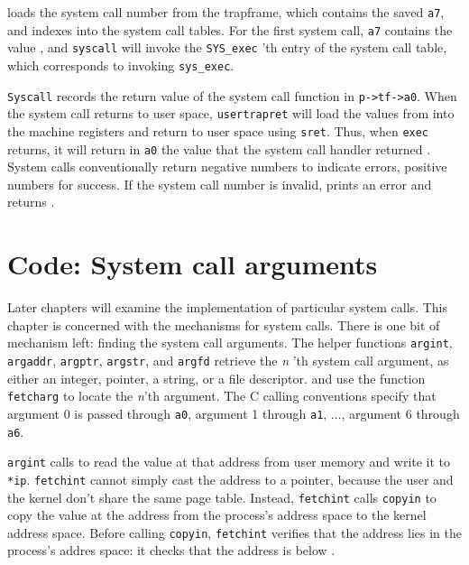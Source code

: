 loads the system call number from the trapframe, which
contains the saved
\texttt{a7},
and indexes into the system call tables.
For the first system call, 
\texttt{a7}
contains the value 
,
and
\lstinline{syscall}
will invoke the 
\lstinline{SYS_exec} 'th 
entry of the system call table, which corresponds to invoking
\lstinline{sys_exec}.

\lstinline{Syscall}
records the return value of the system call function in
\lstinline{p->tf->a0}.
When the system call returns to user space,
\lstinline{usertrapret}
will load the values
from
into the machine registers
and return to user space
using
\lstinline{sret}.
Thus, when 
\lstinline{exec}
returns, it will return in \lstinline{a0} the value
that the system call handler returned
.
System calls conventionally return negative numbers to indicate
errors, positive numbers for success.
If the system call number is invalid,
prints an error and returns .

\section{Code: System call arguments}

Later chapters will examine the implementation of
particular system calls.
This chapter is concerned with the mechanisms for system calls.
There is one bit of mechanism left: finding the system call arguments.
The helper functions
\lstinline{argint},
\lstinline{argaddr},
\lstinline{argptr},
\lstinline{argstr},
and
\lstinline{argfd}
retrieve the 
\textit{n} 'th 
system call
argument, as either an integer, pointer, a string, or a file descriptor.
and
use the function
\lstinline{fetcharg}
to locate the
\textit{n}'th 
argument. The C calling conventions specify that argument 0 is passed
through
\texttt{a0},
argument 1 through
\texttt{a1}, ...,
argument 6 through
\texttt{a6}.

\lstinline{argint} calls  to read the value at
that address from user memory and write it to \lstinline{*ip}.
\lstinline{fetchint} cannot simply cast the address to a pointer,
because the user and the kernel don't share the same page
table. Instead, \lstinline{fetchint} calls \lstinline{copyin} to copy
the value at the address from the process's address space to the
kernel address space.  Before calling \lstinline{copyin},
\lstinline{fetchint} verifies that the address lies in the process's
addres space: it checks that the address is below .

